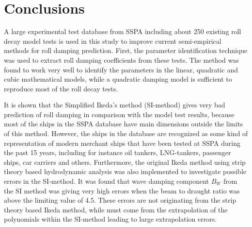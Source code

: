 \section{Conclusions}
\label{se:conclusions}
A large experimental test database from SSPA including about 250 existing roll decay model tests is used in this study to improve current semi-empirical methods for roll damping prediction. First, the parameter identification technique was used to extract roll damping coefficients from these tests. The method was found to work very well to identify the parameters in the linear, quadratic and cubic mathematical models, while a quadratic damping model is sufficient to reproduce most of the roll decay tests.

It is shown that the Simplified Ikeda's method (SI-method) gives very bad prediction of roll damping in comparison with the model test results, because most of the ships in the SSPA database have main dimensions outside the limits of this method. However, the ships in the database are recognized as some kind of representation of modern merchant ships that have been tested at SSPA during the past 15 years, including for instance oil tankers, LNG-tankers, passenger ships, car carriers and others. 
Furthermore, the original Ikeda method using strip theory based hydrodynamic analysis was also implemented to investigate possible errors in the SI-method. 
It was found that wave damping component $B_W$ from the SI method was giving very high errors when the beam to draught ratio was above the limiting value of 4.5. These errors are not originating from the strip theory based Ikeda method, while must come from the extrapolation of the polynomials within the SI-method leading to large extrapolation errors. 

